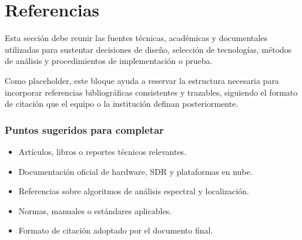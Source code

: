 \chapter{Referencias}

Esta sección debe reunir las fuentes técnicas, académicas y documentales utilizadas
para sustentar decisiones de diseño, selección de tecnologías, métodos de análisis
y procedimientos de implementación o prueba.

Como placeholder, este bloque ayuda a reservar la estructura necesaria para incorporar
referencias bibliográficas consistentes y trazables, siguiendo el formato de citación
que el equipo o la institución definan posteriormente.

\subsection*{Puntos sugeridos para completar}
\begin{itemize}[leftmargin=*]
  \item Artículos, libros o reportes técnicos relevantes.
  \item Documentación oficial de hardware, SDR y plataformas en nube.
  \item Referencias sobre algoritmos de análisis espectral y localización.
  \item Normas, manuales o estándares aplicables.
  \item Formato de citación adoptado por el documento final.
\end{itemize}

